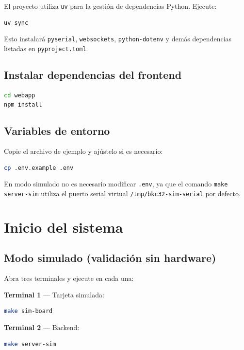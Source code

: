 \documentclass[11pt,a4paper,spanish]{book}
\begin{document}
El proyecto utiliza \texttt{uv} para la gesti\'{o}n de dependencias Python. Ejecute:

\begin{lstlisting}[language=bash]
uv sync
\end{lstlisting}

Esto instalar\'{a} \texttt{pyserial}, \texttt{websockets}, \texttt{python-dotenv} y dem\'{a}s dependencias listadas en \texttt{pyproject.toml}.

\section{Instalar dependencias del frontend}

\begin{lstlisting}[language=bash]
cd webapp
npm install
\end{lstlisting}

\section{Variables de entorno}

Copie el archivo de ejemplo y aj\'{u}stelo si es necesario:

\begin{lstlisting}[language=bash]
cp .env.example .env
\end{lstlisting}

En modo simulado no es necesario modificar \texttt{.env}, ya que el comando \texttt{make server-sim} utiliza el puerto serial virtual \texttt{/tmp/bkc32-sim-serial} por defecto.

\chapter{Inicio del sistema}

\section{Modo simulado (validaci\'{o}n sin hardware)}

Abra tres terminales y ejecute en cada una:

\textbf{Terminal 1} --- Tarjeta simulada:
\begin{lstlisting}[language=bash]
make sim-board
\end{lstlisting}

\textbf{Terminal 2} --- Backend:
\begin{lstlisting}[language=bash]
make server-sim
\end{lstlisting}
\end{document}
